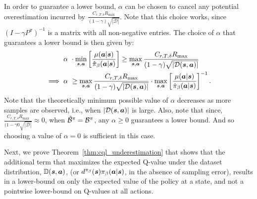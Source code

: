 In order to guarantee a lower bound, $\alpha$ can be chosen to cancel any potential overestimation incurred by $\frac{C_{r, T, \delta} R_{\max}}{(1 - \gamma)\sqrt{|\mathcal{D}|}}$. Note that this  choice works, since $(I - \gamma P^\pi)^{-1}$ is a matrix with all non-negative entries. The choice of $\alpha$ that guarantees a lower bound is then given by:
\begin{align*}
    \alpha& ~ \cdot \min_{\boldsymbol{s}, \boldsymbol{a}} \left[\frac{\mu(\boldsymbol{a}|\boldsymbol{s})}{\hat{\pi}_\beta(\boldsymbol{a}|\boldsymbol{s})} \right] \geq \max_{\boldsymbol{s}, \boldsymbol{a}} \frac{C_{r, T, \delta} R_{\max}}{(1 - \gamma) \sqrt{|\mathcal{D}(\boldsymbol{s}, \boldsymbol{a})|}}\\
    \implies \alpha&~ \geq \max_{\boldsymbol{s}, \boldsymbol{a}} \frac{C_{r, T, \delta} R_{\max}}{(1 - \gamma) \sqrt{|\mathcal{D}(\boldsymbol{s}, \boldsymbol{a})|}} \cdot \max_{\boldsymbol{s}, \boldsymbol{a}} \left[\frac{\mu(\boldsymbol{a}|\boldsymbol{s})}{\hat{\pi}_\beta(\boldsymbol{a}|\boldsymbol{s})} \right]^{-1}.
\end{align*}
Note that the theoretically minimum possible value of $\alpha$ decreases as more samples are observed, i.e., when $|\mathcal{D}(\boldsymbol{s}, \boldsymbol{a})|$ is large. Also, note that since, $\frac{C_{r, T, \delta} R_{\max}}{(1 - \gamma0 \sqrt{|\mathcal{D}|}} \approx 0$, when $\hat{\mathcal{B}}^\pi = \mathcal{B}^\pi$, any $\alpha \geq 0$ guarantees a lower bound. And so choosing a value of $\alpha = 0$ is sufficient in this case.

Next, we prove Theorem~\ref{thm:cql_underestimation} that shows that the additional term that maximizes the expected Q-value under the dataset distribution, $\mathbb{D}(\boldsymbol{s}, \boldsymbol{a})$, (or $d^{\pi_\beta}(\boldsymbol{s}) {\pi_\beta}(\boldsymbol{a}|\boldsymbol{s})$, in the absence of sampling error), results in a lower-bound on only the expected value of the policy at a state, and not a pointwise lower-bound on Q-values at all actions.

~



